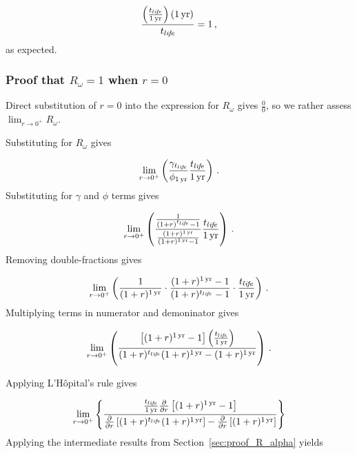 \begin{equation}
  \frac{\left( \frac{t_{li\!f\!e}}{1\,\mathrm{yr}} \right) (1\,\mathrm{yr})}{t_{li\!f\!e}} = 1 \, ,
\end{equation}
%
as expected.



\subsubsection{Proof that $R_\omega = 1$ when $r = 0$}
\label{sec:proof_R_omega}

Direct substitution of $r = 0$ into the expression
for $R_\omega$ gives $\frac{0}{0}$, 
so we rather assess
$\lim_{r \to 0^+} R_\omega$.

Substituting for $R_\omega$ gives

\begin{equation}
  \lim_{r \to 0^+} \left( \frac{\gamma_{t_{li\!f\!e}}}{\phi_{1\,\mathrm{yr}}} \frac{t_{li\!f\!e}}{1\,\mathrm{yr}} \right) \, .
\end{equation}
%
Substituting for $\gamma$ and $\phi$ terms gives

\begin{equation}
  \lim_{r \to 0^+} \left( \frac{\frac{1}{(1 + r)^{t_{li\!f\!e}} - 1}}{\frac{(1 + r)^{1\,\mathrm{yr}}}{(1 + r)^{1\,\mathrm{yr}} - 1}} \frac{t_{li\!f\!e}}{1\,\mathrm{yr}} \right) \, .
\end{equation}
%
Removing double-fractions gives

\begin{equation}
  \lim_{r \to 0^+} \left(
  \frac{1}{(1 + r)^{1\,\mathrm{yr}}} \cdot
  \frac{(1 + r)^{1\,\mathrm{yr}} - 1}{(1 + r)^{t_{li\!f\!e}} - 1} \cdot
  \frac{t_{li\!f\!e}}{1\,\mathrm{yr}}
  \right) \, .
\end{equation}
%
Multiplying terms in numerator and demoninator gives

\begin{equation}
  \lim_{r \to 0^+} 
  \left(
    \frac{\left[ (1 + r)^{1\,\mathrm{yr}} - 1 \right] \left( \frac{t_{li\!f\!e}}{1\,\mathrm{yr}} \right)}
    {(1 + r)^{t_{li\!f\!e}} (1 + r)^{1\,\mathrm{yr}} - (1 + r)^{1\,\mathrm{yr}}} 
  \right) \, .
\end{equation}

Applying L'H\^{o}pital's rule gives

\begin{equation}
  \lim_{r \to 0^+} 
  \left\{
    \frac{\frac{t_{li\!f\!e}}{1\,\mathrm{yr}}
      \frac{\partial}{\partial r} 
        \left[ (1 + r)^{1\,\mathrm{yr}} - 1 \right]}
    {\frac{\partial}{\partial r} \left[ (1 + r)^{t_{li\!f\!e}} (1 + r)^{1\,\mathrm{yr}} \right] - 
     \frac{\partial}{\partial r} \left[ (1 + r)^{1\,\mathrm{yr}} \right]}
  \right\}
\end{equation}
%
Applying the intermediate results from Section~\ref{sec:proof_R_alpha} yields

